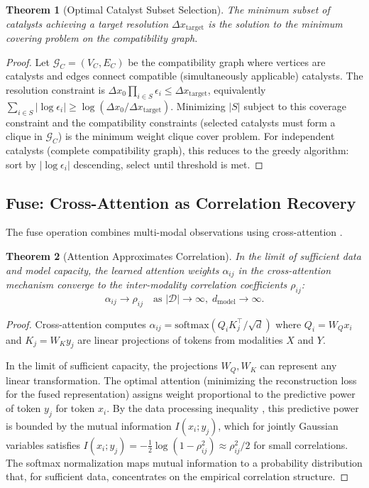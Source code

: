 \documentclass[twocolumn,10pt,a4paper]{article}
\newtheorem{theorem}{Theorem}[section]
\theoremstyle{definition}
\theoremstyle{remark}
\begin{document}
\begin{theorem}[Optimal Catalyst Subset Selection]
\label{thm:optimal_subset}
The minimum subset of catalysts achieving a target resolution $\Delta x_{\mathrm{target}}$ is the solution to the minimum covering problem on the compatibility graph.
\end{theorem}

\begin{proof}
Let $\mathcal{G}_C = (V_C, E_C)$ be the compatibility graph where vertices are catalysts and edges connect compatible (simultaneously applicable) catalysts. The resolution constraint is $\Delta x_0 \prod_{i \in S} \epsilon_i \leq \Delta x_{\mathrm{target}}$, equivalently $\sum_{i \in S} |\log \epsilon_i| \geq \log(\Delta x_0 / \Delta x_{\mathrm{target}})$. Minimizing $|S|$ subject to this coverage constraint and the compatibility constraints (selected catalysts must form a clique in $\mathcal{G}_C$) is the minimum weight clique cover problem. For independent catalysts (complete compatibility graph), this reduces to the greedy algorithm: sort by $|\log \epsilon_i|$ descending, select until threshold is met.
\end{proof}

\subsection{Fuse: Cross-Attention as Correlation Recovery}

The fuse operation combines multi-modal observations using cross-attention \citep{Vaswani2017}.

\begin{theorem}[Attention Approximates Correlation]
\label{thm:attention_correlation}
In the limit of sufficient data and model capacity, the learned attention weights $\alpha_{ij}$ in the cross-attention mechanism converge to the inter-modality correlation coefficients $\rho_{ij}$:
\begin{equation}
    \alpha_{ij} \to \rho_{ij} \quad \text{as } |\mathcal{D}| \to \infty, \; d_{\mathrm{model}} \to \infty.
\end{equation}
\end{theorem}

\begin{proof}
Cross-attention computes $\alpha_{ij} = \mathrm{softmax}(Q_i K_j^\top / \sqrt{d})$ where $Q_i = W_Q x_i$ and $K_j = W_K y_j$ are linear projections of tokens from modalities $X$ and $Y$.

In the limit of sufficient capacity, the projections $W_Q, W_K$ can represent any linear transformation. The optimal attention (minimizing the reconstruction loss for the fused representation) assigns weight proportional to the predictive power of token $y_j$ for token $x_i$. By the data processing inequality \citep{CoverThomas2006}, this predictive power is bounded by the mutual information $I(x_i; y_j)$, which for jointly Gaussian variables satisfies $I(x_i; y_j) = -\frac{1}{2}\log(1 - \rho_{ij}^2) \approx \rho_{ij}^2/2$ for small correlations. The softmax normalization maps mutual information to a probability distribution that, for sufficient data, concentrates on the empirical correlation structure.
\end{proof}
\end{document}
